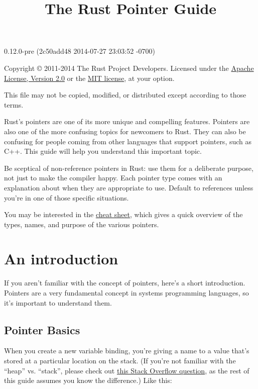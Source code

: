 \documentclass[]{article}
\title{The Rust Pointer Guide}
\begin{document}
\maketitle

0.12.0-pre (2c50add48 2014-07-27 23:03:52 -0700)

Copyright © 2011-2014 The Rust Project Developers. Licensed under the
\href{http://www.apache.org/licenses/LICENSE-2.0}{Apache License,
Version 2.0} or the \href{http://opensource.org/licenses/MIT}{MIT
license}, at your option.

This file may not be copied, modified, or distributed except according
to those terms.

{
\hypersetup{linkcolor=black}
\setcounter{tocdepth}{3}
\tableofcontents
}
Rust's pointers are one of its more unique and compelling features.
Pointers are also one of the more confusing topics for newcomers to
Rust. They can also be confusing for people coming from other languages
that support pointers, such as C++. This guide will help you understand
this important topic.

Be sceptical of non-reference pointers in Rust: use them for a
deliberate purpose, not just to make the compiler happy. Each pointer
type comes with an explanation about when they are appropriate to use.
Default to references unless you're in one of those specific situations.

You may be interested in the \hyperref[cheat-sheet]{cheat sheet}, which
gives a quick overview of the types, names, and purpose of the various
pointers.

\section{An introduction}\label{an-introduction}

If you aren't familiar with the concept of pointers, here's a short
introduction. Pointers are a very fundamental concept in systems
programming languages, so it's important to understand them.

\subsection{Pointer Basics}\label{pointer-basics}

When you create a new variable binding, you're giving a name to a value
that's stored at a particular location on the stack. (If you're not
familiar with the ``heap'' vs. ``stack'', please check out
\href{http://stackoverflow.com/questions/79923/what-and-where-are-the-stack-and-heap}{this
Stack Overflow question}, as the rest of this guide assumes you know the
difference.) Like this:
\end{document}

